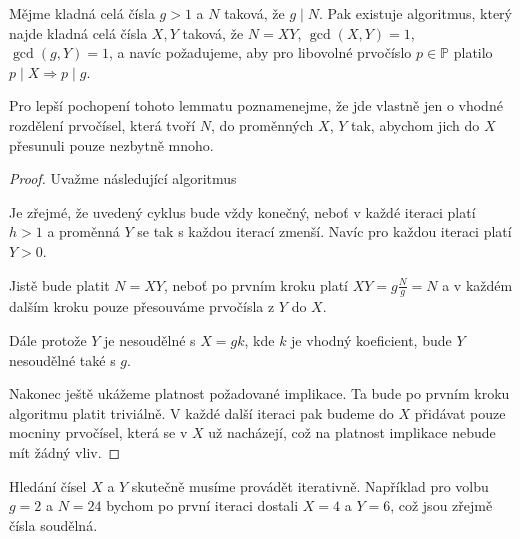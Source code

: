 \begin{lem} \label{factorization}
    Mějme kladná celá čísla $ g > 1 $ a $ N $ taková, že $ g \mid N $. Pak
    existuje algoritmus, který najde kladná celá čísla $ X, Y $ taková, že
    $ N = XY $, $ \gcd(X, Y) = 1 $, $ \gcd(g, Y) = 1 $, a navíc požadujeme, aby
    pro libovolné prvočíslo $ p \in \mathbb{P} $ platilo
    $ p \mid X \Rightarrow p \mid g $.
\end{lem}
\begin{pozn}
Pro lepší pochopení tohoto lemmatu poznamenejme, že jde vlastně jen o vhodné
rozdělení prvočísel, která tvoří $ N $, do proměnných $ X $, $ Y $ tak, abychom
jich do $ X $ přesunuli pouze nezbytně mnoho.
\end{pozn}
\begin{proof}
    Uvažme následující algoritmus\\
    \begin{algorithm}[H] \label{factorization_Algo}
    \end{algorithm}

    Je zřejmé, že uvedený cyklus bude vždy konečný, neboť v každé iteraci platí
    $ h > 1 $ a proměnná $ Y $ se tak s každou iterací zmenší. Navíc pro každou
    iteraci platí $ Y > 0 $.

    Jistě bude platit $ N = XY $, neboť po prvním kroku platí
    $ XY = g \frac{N}{g} = N $ a v každém dalším kroku pouze přesouváme
    prvočísla z $ Y $ do $ X $.

    Dále protože $ Y $ je nesoudělné s $ X = gk $, kde $ k $ je vhodný koeficient,
    bude $ Y $ nesoudělné také s $ g $.

    Nakonec ještě ukážeme platnost požadované implikace. Ta bude po prvním kroku
    algoritmu platit triviálně. V každé další iteraci pak budeme do $ X $
    přidávat pouze mocniny prvočísel, která se v $ X $ už nacházejí, což na platnost
    implikace nebude mít žádný vliv.
\end{proof}
\begin{pozn}
Hledání čísel $ X $ a $ Y $ skutečně musíme provádět iterativně. Například pro
volbu $ g = 2 $ a $ N = 24 $ bychom po první iteraci dostali $ X = 4 $ a $ Y = 6 $,
což jsou zřejmě čísla soudělná.
\end{pozn}

